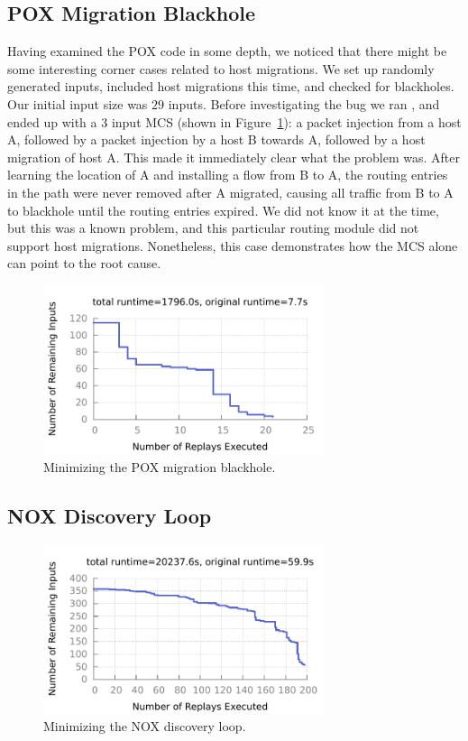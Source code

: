 \subsection{POX Migration Blackhole} %
Having examined the POX code in some depth, we noticed that there might be
some interesting corner cases related to host migrations.
We set up randomly generated inputs, included host
migrations this time, and checked for blackholes. Our initial input size was
$29$ inputs.
Before investigating the bug we
ran \simulator, and ended up with a $3$ input MCS (shown
in Figure~\ref{fig:pox_migration}): a packet injection from a
host A, followed
by a packet injection by a host B towards A, followed by a host migration of host A. This made it immediately
clear what the problem was. After learning the location of A and installing a
flow from B to A, the routing entries in the path were never removed after A
migrated, causing all traffic from B to A to blackhole until the routing
entries expired. We did not know it at the time, but this was a known problem,
and this particular routing module did not support host migrations. Nonetheless, this
case demonstrates how the MCS alone can point to the root cause.

\begin{figure}[t]
    \includegraphics[width=3.25in]{../graphs/runtime/pox_migration_blackhole.pdf}
    \caption[]{\label{fig:pox_migration} Minimizing the POX migration
    blackhole.}
\end{figure}

\subsection{NOX Discovery Loop}

\begin{figure}[t]
    \includegraphics[width=3.25in]{../graphs/runtime/nox_loop.pdf}
    \caption[]{\label{fig:nox_discovery} Minimizing the NOX discovery loop.}
\end{figure}

